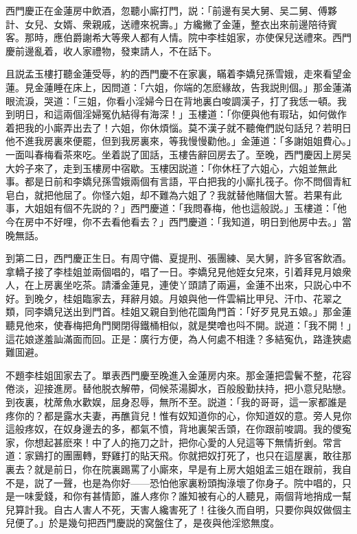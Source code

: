 西門慶正在金蓮房中飲酒，忽聽小廝打門，説：「前邊有吴大舅、吴二舅、傅夥計、女兒、女婿、衆親戚，送禮來祝壽。」方纔撇了金蓮，整衣出來前邊陪待賓客。那時，應伯爵謝希大等衆人都有人情。院中李桂姐家，亦使保兒送禮來。西門慶前邊亂着，收人家禮物，發柬請人，不在話下。

且説孟玉樓打聽金蓮受辱，約的西門慶不在家裏，瞞着李嬌兒孫雪娥，走來看望金蓮。見金蓮睡在床上，因問道：「六姐，你端的怎麽緣故，告我説則個。」那金蓮滿眼流淚，哭道：「三姐，你看小淫婦今日在背地裏白唆調漢子，打了我恁一頓。我到明日，和這兩個淫婦冤仇結得有海深！」玉樓道：「你便與他有瑕玷，如何做作着把我的小廝弄出去了！六姐，你休煩惱。莫不漢子就不聽俺們説句話兒？若明日他不進我房裏來便罷，但到我房裏來，等我慢慢勸他。」金蓮道：「多謝姐姐費心。」一面叫春梅看茶來吃。坐着説了囬話，玉樓告辭回房去了。至晚，西門慶因上房吴大妗子來了，走到玉樓房中宿歇。玉樓因説道：「你休枉了六姐心，六姐並無此事。都是日前和李嬌兒孫雪娥兩個有言語，平白把我的小廝扎筏子。你不問個青紅皂白，就把他屈了。你怪六姐，却不難為六姐了？我就替他賭個大誓。若果有此事，大姐姐有個不先説的？」西門慶道：「我問春梅，他也這般説。」玉樓道：「他今在房中不好哩，你不去看他看去？」西門慶道：「我知道，明日到他房中去。」當晚無話。

到第二日，西門慶正生日。有周守備、夏提刑、張團練、吴大舅，許多官客飲酒。拿轎子接了李桂姐並兩個唱的，唱了一日。李嬌兒見他姪女兒來，引着拜見月娘衆人，在上房裏坐吃茶。請潘金蓮見，連使丫頭請了兩遍，金蓮不出來，只説心中不好。到晚夕，桂姐臨家去，拜辭月娘。月娘與他一件雲絹比甲兒、汗巾、花翠之類，同李嬌兒送出到門首。桂姐又親自到他花園角門首：「好歹見見五娘。」那金蓮聽見他來，使春梅把角門関閉得鐵桶相似，就是樊噲也呌不開。説道：「我不開！」這花娘遂羞訕滿面而回。正是：廣行方便，為人何處不相逢？多結寃仇，路逢狹處難囬避。

不題李桂姐囬家去了。單表西門慶至晚進入金蓮房内來。那金蓮把雲鬢不整，花容倦淡，迎接進房。替他脱衣解帶，伺候茶湯脚水，百般殷勤扶持，把小意兒貼戀。到夜裏，枕蓆魚水歡娱，屈身忍辱，無所不至。説道：「我的哥哥，這一家都誰是疼你的？都是露水夫妻，再醮貨兒！惟有奴知道你的心，你知道奴的意。旁人見你這般疼奴，在奴身邊去的多，都氣不憤，背地裏架舌頭，在你跟前唆調。我的儍寃家，你想起甚麽來！中了人的拖刀之計，把你心愛的人兒這等下無情折剉。常言道：家鷄打的團團轉，野雞打的貼天飛。你就把奴打死了，也只在這屋裏，敢往那裏去？就是前日，你在院裏踢罵了小廝來，早是有上房大姐姐孟三姐在跟前，我自不是，説了一聲，也是為你好——恐怕他家裏粉頭掏淥壞了你身子。院中唱的，只是一味愛錢，和你有甚情節，誰人疼你？誰知被有心的人聽見，兩個背地捎成一幫兒算計我。自古人害人不死，天害人纔害死了！往後久而自明，只要你與奴做個主兒便了。」於是幾句把西門慶説的窝盤住了，是夜與他淫慾無度。


